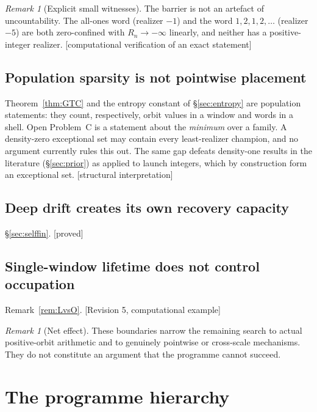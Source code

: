 \documentclass[11pt]{article}
\theoremstyle{plain}
\theoremstyle{definition}
\theoremstyle{remark}
\newtheorem{remark}[theorem]{Remark}
\newcommand{\status}[1]{\textsf{\footnotesize[#1]}}
\begin{document}
\begin{remark}[Explicit small witnesses]
The barrier is not an artefact of uncountability. The all-ones word (realizer $-1$) and the word
$1,2,1,2,\dots$ (realizer $-5$) are both zero-confined with $R_n\to-\infty$ linearly, and neither
has a positive-integer realizer. \status{computational verification of an exact statement}
\end{remark}

\subsection{Population sparsity is not pointwise placement}

Theorem~\ref{thm:GTC} and the entropy constant of \S\ref{sec:entropy} are population statements:
they count, respectively, orbit values in a window and words in a shell. Open Problem~C is a
statement about the \emph{minimum} over a family. A density-zero exceptional set may contain every
least-realizer champion, and no argument currently rules this out. The same gap defeats
density-one results in the literature (\S\ref{sec:prior}) as applied to launch integers, which by
construction form an exceptional set. \status{structural interpretation}

\subsection{Deep drift creates its own recovery capacity}

\S\ref{sec:selffin}. \status{proved}

\subsection{Single-window lifetime does not control occupation}

Remark~\ref{rem:LvsO}. \status{Revision 5, computational example}

\begin{remark}[Net effect]
These boundaries narrow the remaining search to actual positive-orbit arithmetic and to genuinely
pointwise or cross-scale mechanisms. They do not constitute an argument that the programme cannot
succeed.
\end{remark}

\section{The programme hierarchy}\label{sec:hierarchy}
\end{document}
